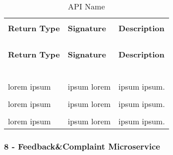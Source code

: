 \begin{longtable}{p{}p{}p{}}
    \caption{API Name}
    \vspace{0.5em}\\
    \hline
    \vspace{0.5em}\\
    \textbf{Return Type} & \textbf{Signature} & \textbf{Description} \\
    \vspace{0.5em}\\
    \hline
    \vspace{0.5em}\\
    \endfirsthead
    \vspace{0.5em}\\
    \hline
    \vspace{0.5em}\\
    \textbf{Return Type} & \textbf{Signature} & \textbf{Description} \\
    \vspace{0.5em}\\
    \hline
    \vspace{0.5em}\\
    \endhead
    
    \vspace{0.5em}\\
    \hline
    \vspace{0.5em}\\
    \endfoot
    
    \vspace{0.5em}\\
    \hline
    \vspace{0.5em}\\
    \endlastfoot
    
    lorem ipsum &
    ipsum lorem &
    ipsum ipsum. \\
    \vspace{0.5em}\\
    lorem ipsum &
    ipsum lorem &
    ipsum ipsum. \\
    \vspace{0.5em}\\
    lorem ipsum &
    ipsum lorem &
    ipsum ipsum. \\

\end{longtable}

\subsubsection{8 - Feedback\&Complaint Microservice}

